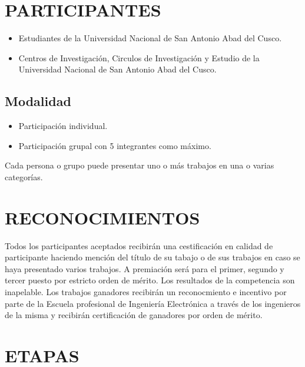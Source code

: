 \documentclass{article}
\begin{document}
 
 

\section{PARTICIPANTES}

\begin{itemize}
\item Estudiantes de la Universidad Nacional de San Antonio Abad del Cusco.
\item Centros de Investigación, Circulos de Investigación y Estudio de la Universidad Nacional de San Antonio Abad del Cusco.
\end{itemize}

\subsection{Modalidad}

\begin{itemize}
\item Participación individual.
\item Participación grupal con 5 integrantes como máximo.
\end{itemize}

Cada persona o grupo puede presentar uno o más trabajos en una o varias categorías.

\section{RECONOCIMIENTOS}

Todos los participantes aceptados recibirán una cestificación en calidad de participante haciendo mención del título de su tabajo o de sus trabajos en caso se haya presentado varios trabajos. A premiación será para el primer, segundo y tercer puesto por estricto orden de mérito. Los resultados de la competencia son inapelable. Los trabajos ganadores recibirán un reconocmiento e incentivo por parte de la Escuela profesional de Ingeniería Electrónica a través de los ingenieros de la misma y recibirán certificación de ganadores por orden de mérito.



\section{ETAPAS}
\end{document}
